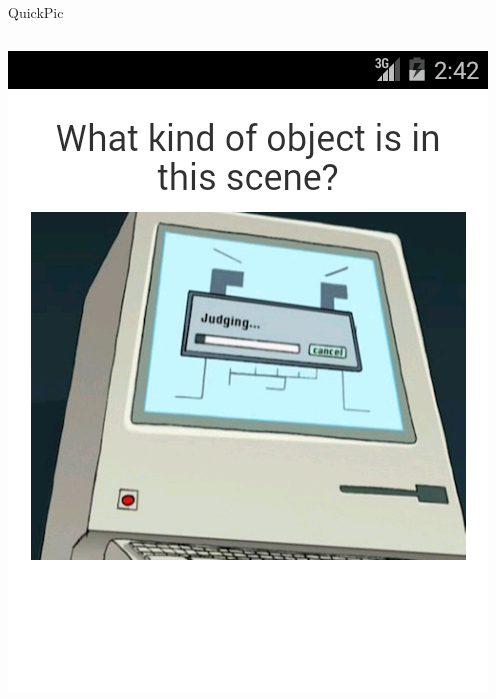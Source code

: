 \documentclass[aspectratio=169]{beamer}
\begin{document}
\begin{frame}{QuickPic}
  \begin{columns}[c]
    \begin{column}{0.5\columnwidth}
      \centering
      \includegraphics[width=\textwidth,height=\textheight,keepaspectratio]{ss_quickpic_image}
    \end{column}
    \begin{column}{0.5\columnwidth}
      \centering

\end{column}
\end{columns}
\end{frame}
\end{document}
